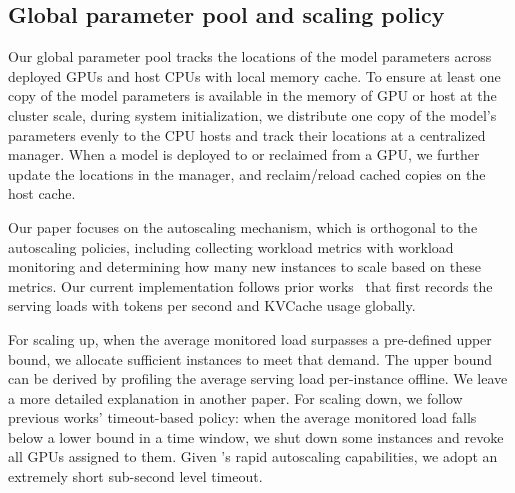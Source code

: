 \subsection{Global parameter pool and scaling policy}
\label{sec:design-others}

Our global parameter pool tracks the locations of the model parameters across deployed GPUs and host CPUs
with local memory cache.
To ensure at least one copy of the model parameters is available in the
memory of GPU or host at the cluster scale,
during system initialization,
we distribute one copy of the model's parameters evenly
to the CPU hosts and track their locations at a centralized manager.
When a model is deployed to or reclaimed from a GPU,
we further update the locations in the manager,
and reclaim/reload cached copies on the host cache.

Our paper focuses on the autoscaling mechanism,
which is orthogonal to the autoscaling policies,
including
collecting workload metrics with workload monitoring
and determining how many new instances to scale based on these metrics.
Our current implementation follows prior works~\cite{DBLP:conf/osdi/SunHZXZL024,K8S-HPA}
that first records the serving loads with tokens per second and KVCache usage globally.

For scaling up,
when the average monitored load surpasses a pre-defined upper bound,
we allocate sufficient instances to meet that demand.
The upper bound can be derived by profiling the average serving load per-instance offline.
We leave a more detailed explanation in another paper. 
For scaling down,
we follow previous works'\cite{DBLP:conf/usenix/Romero0YK21,DBLP:journals/corr/abs-2401-14351}
timeout-based policy:
when the average monitored load falls below a lower bound in a time window,
we shut down some instances and revoke all GPUs assigned to them.
Given {\sys}'s rapid autoscaling capabilities,
we adopt an extremely short sub-second level timeout.

